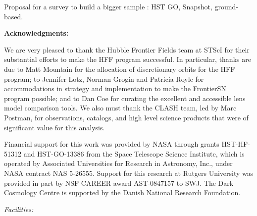 Proposal for a survey to build a bigger sample : HST GO, Snapshot, ground-based.

\bigskip


{\bf Acknowledgments:}

We are very pleased to thank the Hubble Frontier Fields team at STScI
for their substantial efforts to make the HFF program successful.  In
particular, thanks are due to Matt Mountain for the allocation of
discretionary orbits for the HFF program; to Jennifer Lotz, Norman
Grogin and Patricia Royle for accommodations in strategy and
implementation to make the FrontierSN program possible; and to Dan Coe
for curating the excellent and accessible lens model comparison tools.
We also must thank the CLASH team, led by Marc Postman, for
observations, catalogs, and high level science products that were of
significant value for this analysis.

Financial support for this work was provided by NASA through grants
HST-HF-51312 and HST-GO-13386 from the Space Telescope
Science Institute, which is operated by Associated Universities for
Research in Astronomy, Inc., under NASA contract NAS 5-26555.  Support
for this research at Rutgers University was provided in part by NSF
CAREER award AST-0847157 to SWJ.  The Dark Cosmology Centre is
supported by the Danish National Research Foundation.


{\it Facilities:} 
\smallskip






